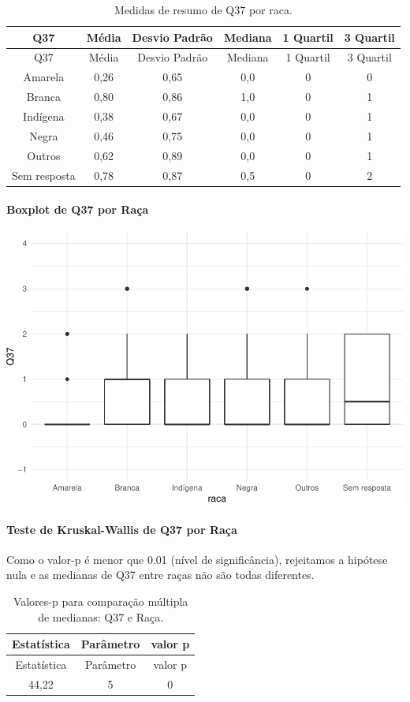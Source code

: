 \documentclass[]{article}
\let\oldparagraph\paragraph
\renewcommand{\paragraph}[1]{\oldparagraph{#1}\mbox{}}
\begin{document}
\begin{longtable}[]{@{}cccccc@{}}
\caption{\label{tab:unnamed-chunk-1403}Medidas de resumo de Q37 por raca.}\tabularnewline
\toprule
Q37 & Média & Desvio Padrão & Mediana & 1 Quartil & 3 Quartil\tabularnewline
\midrule
\endfirsthead
\toprule
Q37 & Média & Desvio Padrão & Mediana & 1 Quartil & 3 Quartil\tabularnewline
\midrule
\endhead
Amarela & 0,26 & 0,65 & 0,0 & 0 & 0\tabularnewline
Branca & 0,80 & 0,86 & 1,0 & 0 & 1\tabularnewline
Indígena & 0,38 & 0,67 & 0,0 & 0 & 1\tabularnewline
Negra & 0,46 & 0,75 & 0,0 & 0 & 1\tabularnewline
Outros & 0,62 & 0,89 & 0,0 & 0 & 1\tabularnewline
Sem resposta & 0,78 & 0,87 & 0,5 & 0 & 2\tabularnewline
\bottomrule
\end{longtable}

\hypertarget{boxplot-de-q37-por-rauxe7a}{%
\paragraph{Boxplot de Q37 por Raça}\label{boxplot-de-q37-por-rauxe7a}}

\begin{center}\includegraphics[width=0.75\linewidth]{relatorio_covid19_files/figure-latex/unnamed-chunk-1404-1} \end{center}

\hypertarget{teste-de-kruskal-wallis-de-q37-por-rauxe7a}{%
\paragraph{Teste de Kruskal-Wallis de Q37 por Raça}\label{teste-de-kruskal-wallis-de-q37-por-rauxe7a}}

Como o valor-p é menor que 0.01 (nível de significância), rejeitamos a hipótese nula e as medianas de Q37 entre raças não são todas diferentes.

\begin{longtable}[]{@{}ccc@{}}
\caption{\label{tab:unnamed-chunk-1406}Valores-p para comparação múltipla de medianas: Q37 e Raça.}\tabularnewline
\toprule
Estatística & Parâmetro & valor p\tabularnewline
\midrule
\endfirsthead
\toprule
Estatística & Parâmetro & valor p\tabularnewline
\midrule
\endhead
44,22 & 5 & 0\tabularnewline
\bottomrule
\end{longtable}
\end{document}
